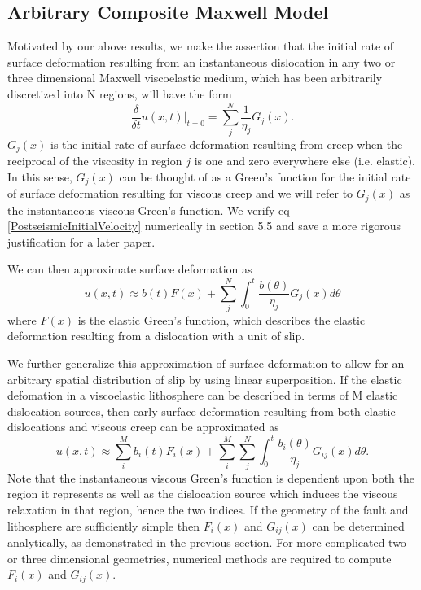\documentclass[12pt]{article}
\begin{document}
\subsection{Arbitrary Composite Maxwell Model}
Motivated by our above results, we make the assertion that the initial
rate of surface deformation resulting from an instantaneous
dislocation in any two or three dimensional Maxwell viscoelastic
medium, which has been arbitrarily discretized into N regions, will
have the form
\begin{equation}\label{PostseismicInitialVelocity}
  \frac{\delta}{\delta t}u(x,t)\big|_{t=0} = \sum_j^N\frac{1}{\eta_j}G_j(x).
\end{equation}
$G_j(x)$ is the initial rate of surface deformation resulting from
creep when the reciprocal of the viscosity in region $j$ is one and
zero everywhere else (i.e. elastic).  In this sense, $G_j(x)$ can be
thought of as a Green's function for the initial rate of surface
deformation resulting for viscous creep and we will refer to $G_j(x)$
as the instantaneous viscous Green's function.  We verify eq
\ref{PostseismicInitialVelocity} numerically in section 5.5 and save a
more rigorous justification for a later paper.

We can then approximate surface deformation as
\begin{equation}
  u(x,t) \approx b(t)F(x) + \sum_j^N\int_0^t \frac{b(\theta)}{\eta_j}G_j(x) d\theta
\end{equation}
where $F(x)$ is the elastic Green's function, which describes the
elastic deformation resulting from a dislocation with a unit of slip.

We further generalize this approximation of surface deformation to
allow for an arbitrary spatial distribution of slip by using linear
superposition.  If the elastic defomation in a viscoelastic
lithosphere can be described in terms of M elastic dislocation
sources, then early surface deformation resulting from both elastic
dislocations and viscous creep can be approximated as
\begin{equation}\label{Postseismic_Approximation}
u(x,t) \approx \sum_i^Mb_i(t)F_i(x) + 
               \sum_i^M\sum_j^N\int_0^t\frac{b_i(\theta)}{\eta_j}G_{ij}(x) d\theta.
\end{equation}
Note that the instantaneous viscous Green's function is dependent upon
both the region it represents as well as the dislocation source which
induces the viscous relaxation in that region, hence the two indices.
If the geometry of the fault and lithosphere are sufficiently simple
then $F_i(x)$ and $G_{ij}(x)$ can be determined analytically, as
demonstrated in the previous section.  For more complicated two or
three dimensional geometries, numerical methods are required to
compute $F_i(x)$ and $G_{ij}(x)$.
\end{document}
